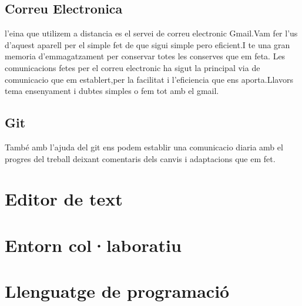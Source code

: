 \subsection{Correu Electronica}
l'eina que utilizem a distancia es el servei de correu electronic Gmail.Vam fer l'us d'aquest aparell per el simple fet de que sigui simple pero eficient.I te una gran memoria d'emmagatzament per conservar totes les conserves que em feta.
Les comunicacions fetes per el correu electronic ha sigut la principal via de comunicacio que em establert,per la facilitat i l'eficiencia que ens aporta.Llavors tema ensenyament i dubtes simples o fem tot amb el gmail.

\subsection{Git}
També amb l'ajuda del git ens podem establir una comunicacio diaria amb el progres del treball deixant comentaris dels canvis i adaptacions que em fet.


\section{Editor de text}\label{4.2}
\section{Entorn col·laboratiu}\label{4.3}
\section{Llenguatge de programació}\label{4.4}

